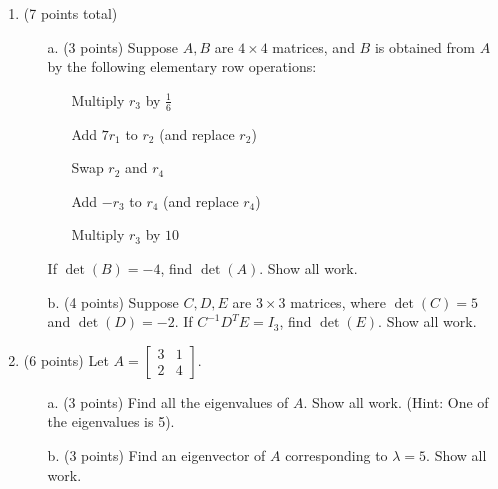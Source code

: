 \documentclass[12pt]{extarticle}
\begin{document}
\begin{enumerate}
\begin{itemize}
\end{itemize}




\newpage

\item (7 points total)
\begin{itemize}
  \item[a.](3 points) Suppose $A,B$ are $4\times 4$ matrices, and $B$ is obtained from $A$ by the following elementary row operations:

  
  \begin{itemize}
  \item[]  Multiply $r_3$ by $\frac{1}{6}$
  \item[]  Add $7r_1$ to $r_2$ (and replace $r_2$)
    \item[]  Swap $r_2$ and $r_4$
  \item[] Add $-r_3$ to $r_4$ (and replace $r_4$)
  \item[]  Multiply $r_3$ by $10$
  \end{itemize}

If $\det(B)=-4$, find $\det(A)$. Show all work.

\vspace{3in}

\item[b.] (4 points) Suppose $C,D,E$ are $3 \times 3$ matrices, where $\det(C)=5$ and $\det(D)=-2$.
If $C^{-1}D^{T}E=I_3$, find $\det(E)$. Show all work.
\end{itemize}

 
    \newpage





\newpage


    \item (6 points) Let $A=\left[\begin{array}{ccc}
3 & 1 
\\
2 &4 
 
\end{array}\right]$. 

\begin{itemize} \item[a.](3 points) Find all the eigenvalues of $A$. Show all work. (Hint: One of the eigenvalues is 5).

\vspace{3in}

\item[b.] (3 points) Find an eigenvector of $A$ corresponding to $\lambda=5$.  Show all work.


\end{itemize}
\end{enumerate}
\end{document}
